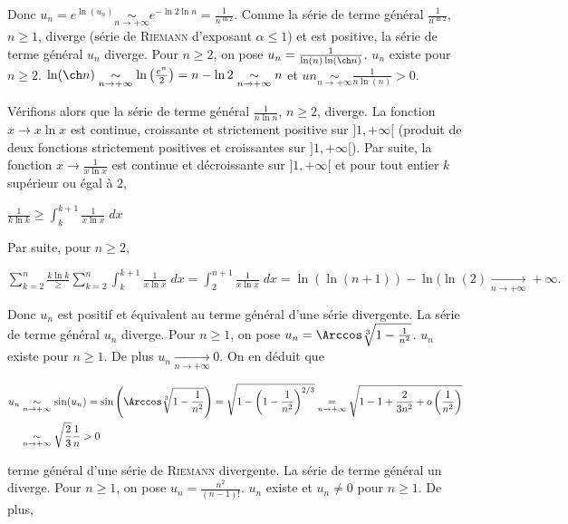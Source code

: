 {{Donc $u_n=e^{\ln(u_n)}\underset{n\rightarrow+\infty}{\sim}e^{-\ln2\ln n}=\frac{1}{n^{\ln2}}$.  Comme la série de terme général $\frac{1}{n^{\ln 2}}$, $n\geqslant1$, diverge (série de \textsc{Riemann} d'exposant $\alpha\leqslant1$) et est positive, la série de terme général $u_n$ diverge.
Pour $n\geqslant2$, on pose $u_n=\frac{1}{\ln(n)\ln(\ch n)}$. $u_n$ existe pour $n\geqslant2$. $\ln(\ch n)\underset{n\rightarrow+\infty}{\sim}\ln\left(\frac{e^n}{2}\right)=n -\ln2\underset{n\rightarrow+\infty}{\sim}n$ et $un\underset{n\rightarrow+\infty}{\sim}\frac{1}{n\ln(n)}>0$.

Vérifions alors que la série de terme général $\frac{1}{n\ln n}$, $n\geqslant2$, diverge. La fonction $x\rightarrow x\ln x$ est continue, croissante et strictement positive sur $]1,+\infty[$ (produit de deux fonctions strictement positives et croissantes sur $]1,+\infty[$). Par suite, la fonction $x\rightarrow\frac{1}{x\ln x}$ est continue et décroissante sur $]1,+\infty[$ et pour tout entier $k$ supérieur ou égal à $2$, 

\begin{center}
$\frac{1}{k\ln k}\geqslant\int_{k}^{k+1}\frac{1}{x\ln x}\;dx$
\end{center}

Par suite, pour $n\geqslant2$, 

\begin{center}
$\sum_{k=2}^{n}\frac{k\ln k}\geqslant\sum_{k=2}^{n}\int_{k}^{k+1}\frac{1}{x\ln x}\;dx=\int_{2}^{n+1}\frac{1}{x\ln x}\;dx=\ln(\ln(n+1)) -\ln(\ln(2)\underset{n\rightarrow+\infty}{\rightarrow}+\infty.$
\end{center}

Donc $u_n$ est positif et équivalent au terme général d'une série divergente. La série de terme général $u_n$ diverge.
Pour $n\geqslant1$, on pose $u_n=\Arccos\sqrt[3]{1-\frac{1}{n^2}}$. $u_n$ existe pour $n\geqslant 1$. De plus $u_n\underset{n\rightarrow+\infty}{\rightarrow}0$. On en déduit que 

\begin{align*}\ensuremath
u_n&\underset{n\rightarrow+\infty}{\sim}\sin(u_n)=\sin\left(\Arccos\sqrt[3]{1-\frac{1}{n^2}}\right) =\sqrt{1-\left(1-\frac{1}{n^2}\right)^{2/3}}\underset{n\rightarrow+\infty}{=}\sqrt{1-1+\frac{2}{3n^2}+o\left(\frac{1}{n^2}\right)}\\
 &\underset{n\rightarrow+\infty}{\sim}\sqrt{\frac{2}{3}}\frac{1}{n}>0
\end{align*}

terme général d'une série de \textsc{Riemann} divergente. La série de terme général un diverge.
Pour $n\geqslant1$, on pose $u_n=\frac{n^2}{(n-1)!}$. $u_n$ existe  et $u_n \neq0$ pour $n\geqslant1$. De plus,

}}
